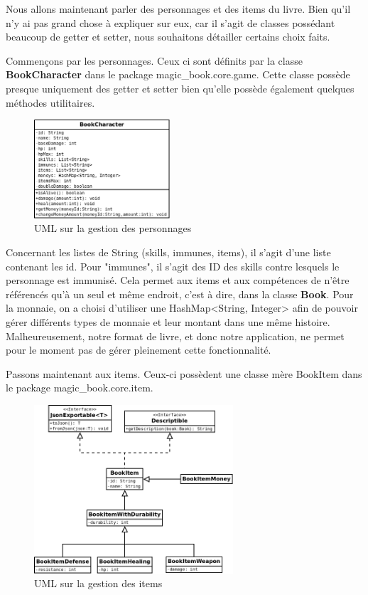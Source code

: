 			Nous allons maintenant parler des personnages et des items du livre. Bien qu'il n'y ai pas grand chose à expliquer sur eux, car il s'agit de classes possédant beaucoup de getter et setter, nous souhaitons détailler certains choix faits.

			Commençons par les personnages. Ceux ci sont définits par la classe \textbf{BookCharacter} dans le package magic\_book.core.game. Cette classe possède presque uniquement des getter et setter bien qu'elle possède également quelques méthodes utilitaires.

			\begin{figure}[H]
				\centering\includegraphics[width=0.45\textwidth, keepaspectratio]{img/book_character.png}
				\caption{UML sur la gestion des personnages}
			\end{figure}

			Concernant les listes de String (skills, immunes, items), il s'agit d'une liste contenant les id. Pour "immunes", il s'agit des ID des skills contre lesquels le personnage est immunisé. Cela permet aux items et aux compétences de n'être référencés qu'à un seul et même endroit, c'est à dire, dans la classe \textbf{Book}. Pour la monnaie, on a choisi d'utiliser une HashMap<String, Integer> afin de pouvoir gérer différents types de monnaie et leur montant dans une même histoire. Malheureusement, notre format de livre, et donc notre application, ne permet pour le moment pas de gérer pleinement cette fonctionnalité.

			Passons maintenant aux items. Ceux-ci possèdent une classe mère BookItem dans le package magic\_book.core.item.

			\begin{figure}[H]
				\centering\includegraphics[width=0.66\textwidth, keepaspectratio]{img/book_item.png}
				\caption{UML sur la gestion des items}
			\end{figure}

